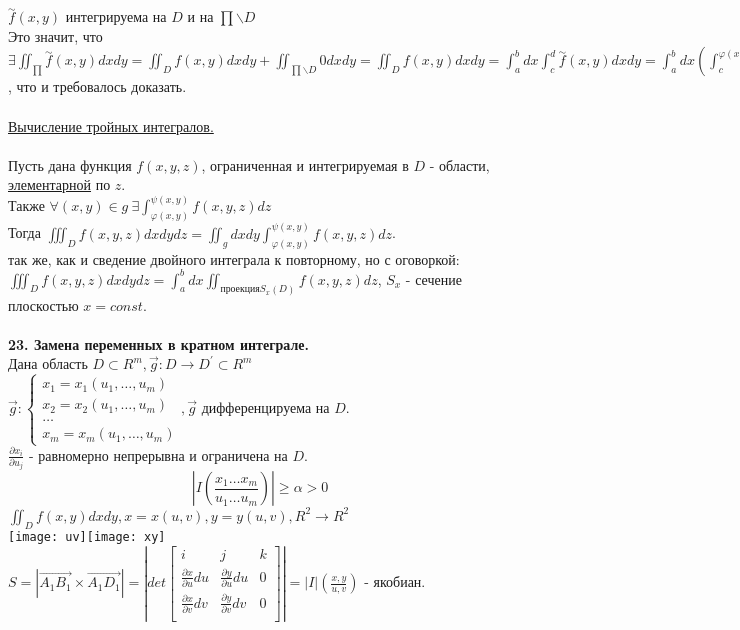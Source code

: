 \documentclass[12pt]{article}
\begin{document}
$\overset{\sim}{f}(x,y)$ интегрируема на $D$ и на $\prod \backslash D$\\
Это значит, что $\exists \iint_{\prod} \overset{\sim}{f}(x,y)dxdy = \iint_D f(x,y)dxdy + \iint_{\prod \backslash D} 0 dxdy = \iint_D f(x,y)dxdy = \int_a^b dx \int_c^d  \overset{\sim}{f}(x,y)dxdy = \int_a^b dx (\int_c^{\varphi(x)} 0dy + \int_{\varphi(x)}^{\psi(x)} f(x,y)dxdy + \int_{\psi(x)}^d 0 dy) = \int_a^b dx \int_{\varphi(x)}^{\psi(x)} f(x,y)dy$, что и требовалось доказать.\\
\\
\label{question22_2}\uline{Вычисление тройных интегралов.}\\
\\
Пусть дана функция $f(x,y,z)$, ограниченная и интегрируемая в $D$ - области, \hyperref[elementaryDomain]{элементарной} по $z$.\\
Также $\forall (x,y) \in g \ \exists \int_{\varphi(x,y)}^{\psi(x,y)} f(x,y,z) dz$\\
Тогда $\iiint_D f(x,y,z)dxdydz = \iint_g dxdy \int_{\varphi(x,y)}^{\psi(x,y)} f(x,y,z)dz$.\\
 так же, как и сведение двойного интеграла к повторному, но с оговоркой:\\
$\iiint_D f(x,y,z)dxdydz = \int_a^b dx \iint_{\text{проекция} S_x(D)} f(x,y,z)dz$, $S_x$ - сечение плоскостью $x = const$.\\
\\
\label{question23_1}\textbf{23. Замена переменных в кратном интеграле.}\\
Дана область $D \subset R^m, \overrightarrow{g} : D \to D^{'} \subset R^m$\\
$\overrightarrow{g} : \begin{cases}x_1 = x_1(u_1,\dots,u_m)\\x_2=x_2(u_1,\dots,u_m)\\ \dots \\ x_m=x_m(u_1,\dots,u_m)\end{cases}, \overrightarrow{g}$ дифференцируема на $D$.\\
$\frac{\partial x_i}{\partial u_j}$ - равномерно непрерывна и ограничена на $D$.\\
$$|I(\frac{x_1\dots x_m}{u_1 \dots u_m})| \geq \alpha > 0$$
$\iint_D f(x,y) dxdy, x=x(u,v), y=y(u,v), R^2 \to R^2$\\
\texttt{[image: uv]}\texttt{[image: xy]}\\
$S = |\overrightarrow{A_1 B_1} \times \overrightarrow{A_1 D_1}|=|det\begin{bmatrix}
     i&j&k \\
    \frac{\partial x}{\partial u}du & \frac{\partial y}{\partial u} du & 0\\
    \frac{\partial x}{\partial v}dv & \frac{\partial y}{\partial v} dv & 0 \\
\end{bmatrix}| = |I|(\frac{x,y}{u,v})$ - якобиан.\\
\end{document}
